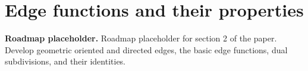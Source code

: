 \chapter{Edge functions and their properties}

\noindent\textbf{Roadmap placeholder.}
Roadmap placeholder for section 2 of the paper. Develop geometric oriented and
directed edges, the basic edge functions, dual subdivisions, and their
identities.

